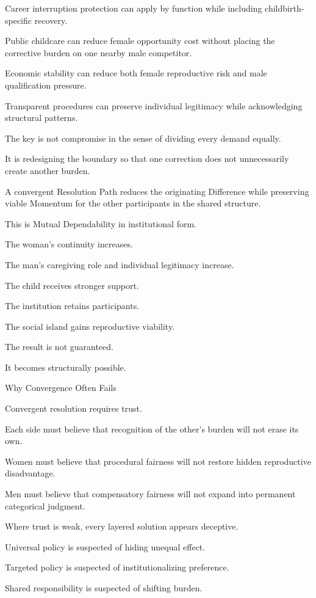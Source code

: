 Career interruption protection can apply by function while including childbirth-specific recovery.

Public childcare can reduce female opportunity cost without placing the corrective burden on one nearby male competitor.

Economic stability can reduce both female reproductive risk and male qualification pressure.

Transparent procedures can preserve individual legitimacy while acknowledging structural patterns.

The key is not compromise in the sense of dividing every demand equally.

It is redesigning the boundary so that one correction does not unnecessarily create another burden.

A convergent Resolution Path reduces the originating Difference while preserving viable Momentum for the other participants in the shared structure.

This is Mutual Dependability in institutional form.

The woman’s continuity increases.

The man’s caregiving role and individual legitimacy increase.

The child receives stronger support.

The institution retains participants.

The social island gains reproductive viability.

The result is not guaranteed.

It becomes structurally possible.

Why Convergence Often Fails

Convergent resolution requires trust.

Each side must believe that recognition of the other’s burden will not erase its own.

Women must believe that procedural fairness will not restore hidden reproductive disadvantage.

Men must believe that compensatory fairness will not expand into permanent categorical judgment.

Where trust is weak, every layered solution appears deceptive.

Universal policy is suspected of hiding unequal effect.

Targeted policy is suspected of institutionalizing preference.

Shared responsibility is suspected of shifting burden.

